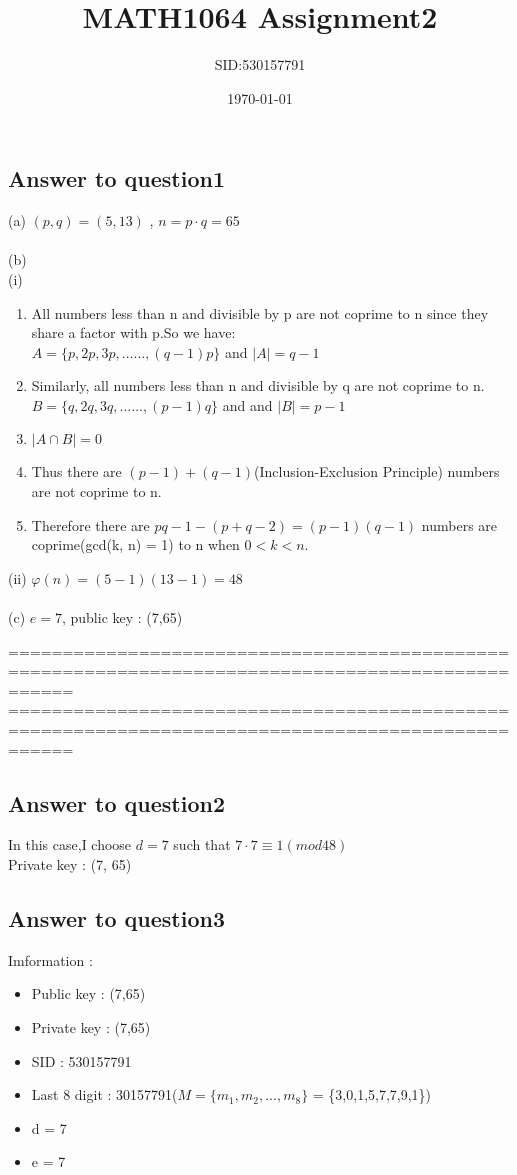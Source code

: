 \documentclass[12pt,a4paper]{article}
\title{MATH1064 Assignment2}
\author{SID:530157791}
\date{\today}
\begin{document}
\maketitle


\subsection*{Answer to question1}
(a) $(p,q) = (5,13)$ ,  $n = p \cdot q = 65$\\\\
(b)\\ 

(i)
\begin{enumerate}
\item All numbers less than n and divisible by p are not coprime to n since they share a factor with p.So we have:\\
$A = \{p,2p,3p, ......,(q-1)p\}$ and $|A| = q-1$

\item Similarly, all numbers less than n and divisible by q are not coprime to n.
$B =  \{q,2q,3q, ......,(p-1)q\}$ and and $|B| = p-1$

\item $|A \cap B| = 0$

\item Thus there are $(p - 1) + (q-1)$(Inclusion-Exclusion Principle) numbers are not coprime to n.

\item Therefore there are $pq - 1 - (p + q - 2) = (p - 1)(q - 1)$ numbers are coprime(gcd(k, n) = 1) to n when $0 < k < n$.
\end{enumerate}
\quad (ii) $ \varphi(n) = (5-1)(13-1) = 48$\\\\
(c) $e = 7$, public key : (7,65)






==================================================================================================
\newpage
==================================================================================================
\subsection*{Answer to question2}
In this case,I choose $d = 7$ such that  $7 \cdot 7 \equiv 1 (mod 48)$\\
Private key : (7, 65)


\subsection*{Answer to question3}
Imformation :
\begin{itemize}
	\item Public key : (7,65)
	\item Private key : (7,65)
	\item SID : 530157791
	\item Last 8 digit : 30157791($M = \{m_1,  m_2 , ..., m_8\}$ = \{3,0,1,5,7,7,9,1\})
	\item d = 7
	\item e = 7
\end{itemize}
\end{document}
